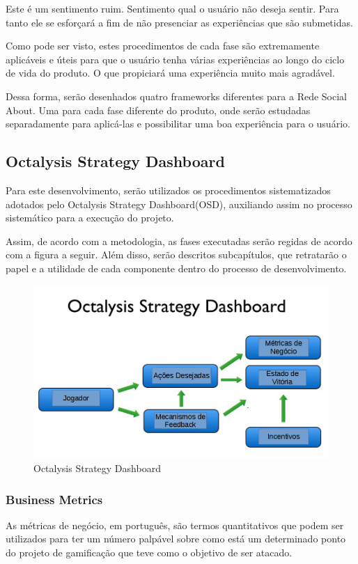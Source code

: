 Este é um sentimento ruim. Sentimento qual o usuário não deseja sentir. Para tanto
ele se esforçará a fim de não presenciar as experiências que são submetidas.

Como pode ser visto, estes procedimentos de cada fase são extremamente aplicáveis
e úteis para que o usuário tenha várias experiências ao longo do ciclo de vida do
produto. O que propiciará uma experiência muito mais agradável.

Dessa forma, serão desenhados quatro frameworks diferentes para a Rede Social About.
Uma para cada fase diferente do produto, onde serão estudadas separadamente para
aplicá-las e possibilitar uma boa experiência para o usuário.

\subsection{Octalysis Strategy Dashboard}
\label{sec:octalysisdashborad}
Para este desenvolvimento, serão utilizados os procedimentos sistematizados adotados
pelo Octalysis Strategy Dashboard(OSD), auxiliando assim no processo sistemático para
a execução do projeto. 

Assim, de acordo com a metodologia, as fases executadas serão regidas de acordo com a
figura a seguir.  Além disso, serão descritos subcapítulos, que retratarão o papel e a 
utilidade de cada componente dentro do processo de desenvolvimento.


 \begin{figure}[h]
     \centering

     \includegraphics[width=450px, scale=1]{figuras/dashboard}
     \caption{Octalysis Strategy Dashboard}

     \label{fig:dashboard}
 \end{figure}

\subsubsection{Business Metrics}
\label{sub:business_metrics}
As métricas de negócio, em português, são termos quantitativos que podem ser utilizados
para ter um número palpável sobre como está um determinado ponto do projeto de gamificação
que teve como o objetivo de ser atacado.

